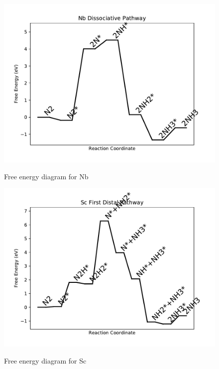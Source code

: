 \documentclass{article}
\begin{document}
\newpage
\begin{figure}
\includegraphics[width=1\linewidth]{data/plots/Nb_dissociative.pdf}
\label{fig:Nb_dissociative}
\caption{Free energy diagram for Nb}
\end{figure}

\begin{figure}
\includegraphics[width=1\linewidth]{data/plots/Sc_distal_1.pdf}
\label{fig:Sc_distal_1}
\caption{Free energy diagram for Sc}
\end{figure}
\end{document}
